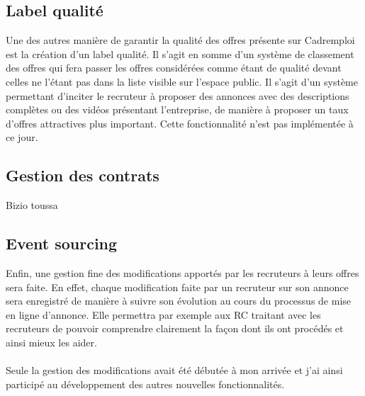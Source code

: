 \subsection{Label qualité}
\label{sub:Label qualité}
Une des autres manière de garantir la qualité des offres présente sur Cadremploi est la création d'un label qualité.
Il s'agit en somme d'un système de classement des offres qui fera passer les offres considérées comme étant de qualité devant celles ne l'étant pas dans la liste visible sur l'espace public.
Il s'agit d'un système permettant d'inciter le recruteur à proposer des annonces avec des descriptions complètes ou des vidéos présentant l'entreprise, de manière à proposer un taux d'offres attractives plus important.
Cette fonctionnalité n'est pas implémentée à ce jour.

\subsection{Gestion des contrats}
\label{sub:Gestion des contrats}
Bizio toussa

\subsection{Event sourcing}
\label{sub:Event sourcing}
Enfin, une gestion fine des modifications apportés par les recruteurs à leurs offres sera faite.
En effet, chaque modification faite par un recruteur sur son annonce sera enregistré de manière à suivre son évolution au cours du processus de mise en ligne d'annonce.
Elle permettra par exemple aux RC traitant avec les recruteurs de pouvoir comprendre clairement la façon dont ils ont procédés et ainsi mieux les aider.

\paragraph{}
Seule la gestion des modifications avait été débutée à mon arrivée et j'ai ainsi participé au développement des autres nouvelles fonctionnalités.
